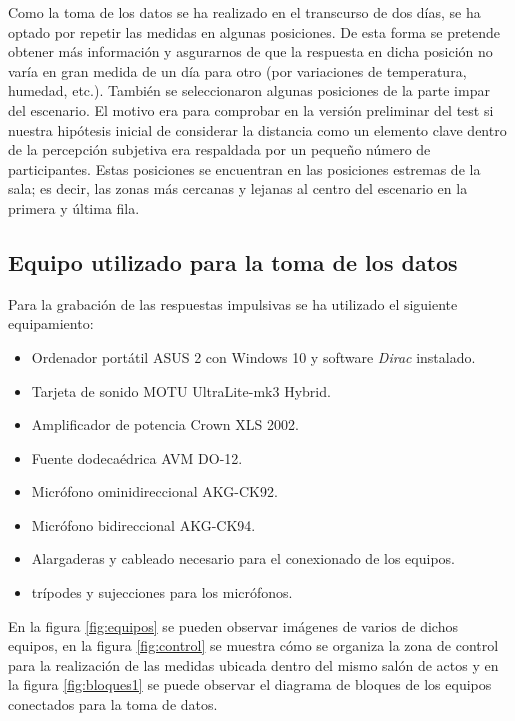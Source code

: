 \documentclass[11pt,a4paper]{book}
\begin{document}
		    Como la toma de los datos se ha realizado en el transcurso de dos días, se ha optado por repetir las medidas en algunas posiciones. De esta forma se pretende obtener más información y asgurarnos de que la respuesta en dicha posición no varía en gran medida de un día para otro (por variaciones de temperatura, humedad, etc.). También se seleccionaron algunas posiciones de la parte impar del escenario. El motivo era para comprobar en la versión preliminar del test si nuestra hipótesis inicial de considerar la distancia como un elemento clave dentro de la percepción subjetiva era respaldada por un pequeño número de participantes. Estas posiciones se encuentran en las posiciones estremas de la sala; es decir, las zonas más cercanas y lejanas al centro del escenario en la primera y última fila. 

	    \subsection{Equipo utilizado para la toma de los datos}
	        Para la grabación de las respuestas impulsivas se ha utilizado el siguiente equipamiento:
	        \begin{itemize}
	            \item Ordenador portátil ASUS 2 con Windows 10 y software \textit{Dirac} instalado.
	            \item Tarjeta de sonido MOTU UltraLite-mk3 Hybrid.
	            \item Amplificador de potencia Crown XLS 2002.
	            \item Fuente dodecaédrica AVM DO-12.
	            \item Micrófono ominidireccional AKG-CK92.
	            \item Micrófono bidireccional AKG-CK94.
	            \item Alargaderas y cableado necesario para el conexionado de los equipos.
	            \item trípodes y sujecciones para los micrófonos.
	        
	        \end{itemize}
	    
	        En la figura \ref{fig:equipos} se pueden observar imágenes de varios de dichos equipos, en la figura \ref{fig:control} se muestra cómo se organiza la zona de control para la realización de las medidas ubicada dentro del mismo salón de actos y en la figura \ref{fig:bloques1} se puede observar el diagrama de bloques de los equipos conectados para la toma de datos.
	    
\end{document}
